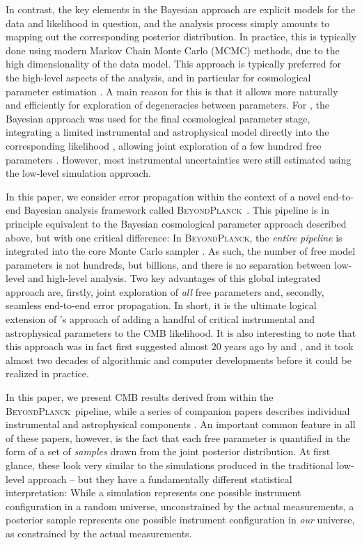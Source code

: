 \documentclass[twocolumn]{aa}
\newcommand{\BP}{\textsc{BeyondPlanck}}
\begin{document}
In contrast, the key elements in the Bayesian approach are explicit
models for the data and likelihood in question, and the analysis
process simply amounts to mapping out the corresponding posterior
distribution. In practice, this is typically done using modern Markov
Chain Monte Carlo (MCMC) methods, due to the high dimensionality of
the data model. This approach is typically preferred for the
high-level aspects of the analysis, and in particular for cosmological
parameter estimation \citep[e.g.,][]{cosmomc}. A main reason for this
is that it allows more naturally and efficiently for exploration of
degeneracies between parameters. For \Planck, the Bayesian approach
was used for the final cosmological parameter stage, integrating a
limited instrumental and astrophysical model directly into the
corresponding likelihood \citep{planck2016-l05}, allowing joint
exploration of a few hundred free parameters
\citep{planck2016-l06}. However, most instrumental uncertainties were
still estimated using the low-level simulation approach.

In this paper, we consider error propagation within the context of a
novel end-to-end Bayesian analysis framework called
\BP\ \citep{bp01}. This pipeline is in principle equivalent to the
Bayesian cosmological parameter approach described above, but with one
critical difference: In \BP, the \emph{entire pipeline} is integrated
into the core Monte Carlo sampler \citep{bp01}. As such, the number of
free model parameters is not hundreds, but billions, and there is no
separation between low-level and high-level analysis. Two key
advantages of this global integrated approach are, firstly, joint
exploration of \emph{all} free parameters and, secondly, seamless
end-to-end error propagation. In short, it is the ultimate logical
extension of \Planck's approach of adding a handful of critical
instrumental and astrophysical parameters to the CMB likelihood. It is
also interesting to note that this approach was in fact first
suggested almost 20 years ago by \citet{jewell2004} and
\citet{wandelt2004}, and it took almost two decades of algorithmic and
computer developments before it could be realized in practice.

In this paper, we present CMB results derived from within the
\BP\ pipeline, while a series of companion papers describes individual
instrumental \citep{bp25,bp06,bp07,bp08,bp09} and astrophysical
components \citep{bp13,bp14,bp15}. An important common feature in all
of these papers, however, is the fact that each free parameter is
quantified in the form of a set of \emph{samples} drawn from the joint
posterior distribution. At first glance, these look very similar to
the simulations produced in the traditional low-level approach -- but
they have a fundamentally different statistical interpretation: While
a simulation represents one possible instrument configuration in a
random universe, unconstrained by the actual measurements, a posterior
sample represents one possible instrument configuration in \emph{our}
universe, as constrained by the actual measurements. 
\end{document}
